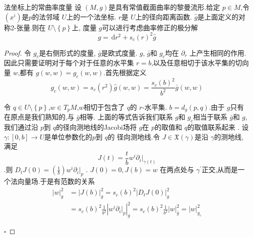 \documentclass[../../main.tex]{subfiles}
\begin{document}
\begin{theorem}{法坐标上的常曲率度量}
    设 \(  \left( M,g \right)   \)是具有常值截面曲率的黎曼流形.给定 \(  p \in M  \),令 \(  \left( x^{i} \right)   \)是\(  p  \)的法邻域 \(  U  \)上的一个法坐标. \(  r  \)是 \(  U  \)上的径向距离函数. \(  \hat{g}  \)是上面定义的对称2-张量.则在 \(  U\setminus \left\{ p \right\}  \)上, 度量 \(  g  \)可以进行考虑曲率修正的极分解 \[
    g =  \,\mathrm{d} r^{2}+ s_{c}\left( r \right)^{2}\hat{g} 
    \]          
    
\end{theorem}
\begin{proof}
    令 \(  g_{c}  \)是右侧形式的度量, \(  \bar{g}  \)是欧式度量.   
    \(  g  \), \(  \bar{g}  \)和 \(  g_{c}  \)均在 \(   \partial _{r}  \)    上产生相同的作用.因此只需要证明对于每个对于任意的水平集 \(  r= b  \),以及任意相切于该水平集的切向量 \(  w  \),都有 \(  g\left( w,w \right)= g_{c}\left( w,w \right)    \).首先根据定义 \[
    g_{c}\left( w,w \right)= s_{c}\left( r^{2} \right)  \hat{g}\left( w,w \right)= \frac{s_{c}\left( b \right)^{2}  }{b^{2} }\bar{g}\left( w,w \right)   
    \]   

    令 \(  q \in U\setminus \left\{ p \right\}  \),\(  w\in T_{p}M  \),\(  w  \)相切于包含了 \(  q  \)的 \(  r  \)-水平集. \(  b = d _{g}\left( p,q \right)   \).由于 \(  g  \)只有在原点是我们熟知的,与 \(  \bar{g}  \)相等. 上面的等式告诉我们联系 \(  g  \)和 \(  g_{c}  \)相当于联系 \(  \bar{g}  \)和 \( g  \),我们通过沿 \(  p  \)到 \(  q  \)的径向测地线的Jacobi场将 \(  g  \)在 \(  p  \)的取值和 \(  q  \)的取值联系起来   .     设 \(   \gamma :[0,b]\to U  \)是单位参数化的\(  p  \)到 \(  q  \)的  径向测地线.令 \(  J \in \mathfrak{X}\left(  \gamma  \right)   \)是沿 \(   \gamma   \)的测地线,满足 \[
    J\left( t \right)= \frac{t }{b }w^{i}\left.  \partial _{i} \right|_{ \gamma \left( t \right) }  
    \].则 \(  D_{t}J\left( 0 \right)= \left( \frac{1}{b} \right)w^{i}\left.  \partial _{i} \right|_{p}    \)   . \(  J\left( 0 \right)= 0, J\left( b \right)= w    \)         在两点处与 \(   \gamma ^{\prime}   \)正交,从而是一个法向量场.于是有范数的关系 \[
    \begin{aligned}
        \left| w \right|_{g}^{2}&= \left| J\left( b \right)  \right|_{g}^{2}= s_{c}\left( b \right)^{2}\left| D_{t}J\left( 0 \right)  \right|_{g}^{2}  \\ 
         &= s_{c}\left( b \right)^{2} \frac{1 }{b^{2} }\left| w^{i} \left.  \partial _{i} \right|_{p} \right|_{g}^{2}= s_{c}\left( b \right)^{2}\frac{1 }{b^{2} }\left| w \right|_{\bar{g}}^{2}= \left| w \right|_{g_{c}}          ^{2}
    \end{aligned}
    \] 

    \hfill $\square$
\end{proof}
\end{document}
